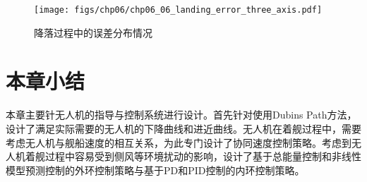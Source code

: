 \begin{figure}[!tb]
	\centering
	\texttt{[image: figs/chp06/chp06\_06\_landing\_error\_three\_axis.pdf]}	
	\caption{降落过程中的误差分布情况}
	\label{fig:chp06_06_landing_error_three_axis}
\end{figure}

\section{本章小结}
本章主要针无人机的指导与控制系统进行设计。首先针对使用Dubins Path方法，设计了满足实际需要的无人机的下降曲线和进近曲线。无人机在着舰过程中，需要考虑无人机与舰船速度的相互关系，为此专门设计了协同速度控制策略。考虑到无人机着舰过程中容易受到侧风等环境扰动的影响，设计了基于总能量控制和非线性模型预测控制的外环控制策略与基于PD和PID控制的内环控制策略。

